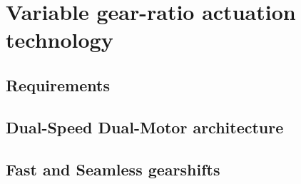 \chapter{Variable gear-ratio actuation technology}
\label{sec:MultipleSpeedActuationTechnology}

\section{Requirements}
\label{sec:Requirements}


\section{Dual-Speed Dual-Motor architecture}
\label{sec:DSDM}


\section{Fast and Seamless gearshifts}
\label{sec:FastAndSeamlessGearshifts}



